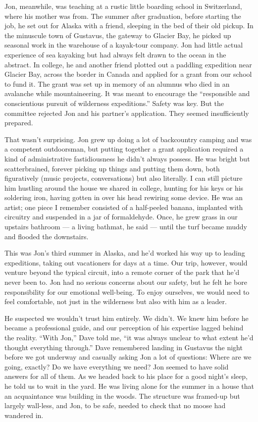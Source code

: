 Jon, meanwhile, was teaching at a rustic little boarding school in
Switzerland, where his mother was from. The summer after graduation,
before starting the job, he set out for Alaska with a friend, sleeping
in the bed of their old pickup. In the minuscule town of Gustavus, the
gateway to Glacier Bay, he picked up seasonal work in the warehouse of a
kayak-tour company. Jon had little actual experience of sea kayaking but
had always felt drawn to the ocean in the abstract. In college, he and
another friend plotted out a paddling expedition near Glacier Bay,
across the border in Canada and applied for a grant from our school to
fund it. The grant was set up in memory of an alumnus who died in an
avalanche while mountaineering. It was meant to encourage the
``responsible and conscientious pursuit of wilderness expeditions.''
Safety was key. But the committee rejected Jon and his partner's
application. They seemed insufficiently prepared.

That wasn't surprising. Jon grew up doing a lot of backcountry camping
and was a competent outdoorsman, but putting together a grant
application required a kind of administrative fastidiousness he didn't
always possess. He was bright but scatterbrained, forever picking up
things and putting them down, both figuratively (music projects,
conversations) but also literally. I can still picture him hustling
around the house we shared in college, hunting for his keys or his
soldering iron, having gotten in over his head rewiring some device. He
was an artist; one piece I remember consisted of a half-peeled banana,
implanted with circuitry and suspended in a jar of formaldehyde. Once,
he grew grass in our upstairs bathroom --- a living bathmat, he said ---
until the turf became muddy and flooded the downstairs.

This was Jon's third summer in Alaska, and he'd worked his way up to
leading expeditions, taking out vacationers for days at a time. Our
trip, however, would venture beyond the typical circuit, into a remote
corner of the park that he'd never been to. Jon had no serious concerns
about our safety, but he felt he bore responsibility for our emotional
well-being. To enjoy ourselves, we would need to feel comfortable, not
just in the wilderness but also with him as a leader.

He suspected we wouldn't trust him entirely. We didn't. We knew him
before he became a professional guide, and our perception of his
expertise lagged behind the reality. ``With Jon,'' Dave told me, ``it
was always unclear to what extent he'd thought everything through.''
Dave remembered landing in Gustavus the night before we got underway and
casually asking Jon a lot of questions: Where are we going, exactly? Do
we have everything we need? Jon seemed to have solid answers for all of
them. As we headed back to his place for a good night's sleep, he told
us to wait in the yard. He was living alone for the summer in a house
that an acquaintance was building in the woods. The structure was
framed-up but largely wall-less, and Jon, to be safe, needed to check
that no moose had wandered in.

